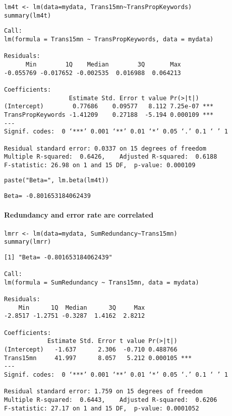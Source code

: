 \documentclass[10pt]{article}
\begin{document}
\begin{verbatim}
lm4t <- lm(data=mydata, Trans15mn~TransPropKeywords)
summary(lm4t)
\end{verbatim}

\begin{verbatim}
Call:
lm(formula = Trans15mn ~ TransPropKeywords, data = mydata)

Residuals:
      Min        1Q    Median        3Q       Max 
-0.055769 -0.017652 -0.002535  0.016988  0.064213 

Coefficients:
                  Estimate Std. Error t value Pr(>|t|)    
(Intercept)        0.77686    0.09577   8.112 7.25e-07 ***
TransPropKeywords -1.41209    0.27188  -5.194 0.000109 ***
---
Signif. codes:  0 ‘***’ 0.001 ‘**’ 0.01 ‘*’ 0.05 ‘.’ 0.1 ‘ ’ 1

Residual standard error: 0.0337 on 15 degrees of freedom
Multiple R-squared:  0.6426,	Adjusted R-squared:  0.6188 
F-statistic: 26.98 on 1 and 15 DF,  p-value: 0.000109
\end{verbatim}

\begin{verbatim}
paste("Beta=", lm.beta(lm4t))
\end{verbatim}

\begin{verbatim}
Beta= -0.801653184062439
\end{verbatim}



\paragraph*{Redundancy and error rate are correlated}
\label{sec-2-2-2-3}

\begin{verbatim}
lmrr <- lm(data=mydata, SumRedundancy~Trans15mn)
summary(lmrr)
\end{verbatim}

\begin{verbatim}
[1] "Beta= -0.801653184062439"

Call:
lm(formula = SumRedundancy ~ Trans15mn, data = mydata)

Residuals:
    Min      1Q  Median      3Q     Max 
-2.8517 -1.2751 -0.3287  1.4162  2.8212 

Coefficients:
            Estimate Std. Error t value Pr(>|t|)    
(Intercept)   -1.637      2.306  -0.710 0.488766    
Trans15mn     41.997      8.057   5.212 0.000105 ***
---
Signif. codes:  0 ‘***’ 0.001 ‘**’ 0.01 ‘*’ 0.05 ‘.’ 0.1 ‘ ’ 1

Residual standard error: 1.759 on 15 degrees of freedom
Multiple R-squared:  0.6443,	Adjusted R-squared:  0.6206 
F-statistic: 27.17 on 1 and 15 DF,  p-value: 0.0001052
\end{verbatim}
\end{document}

